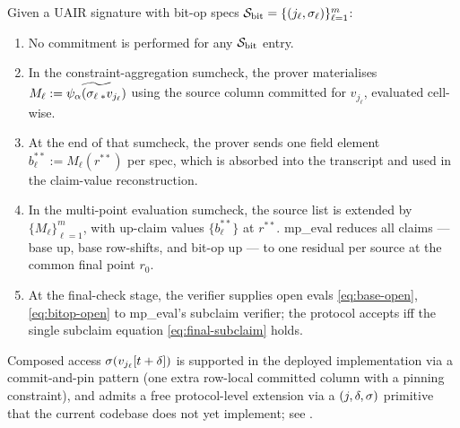 \begin{construction}
\label{cons:bitop}
Given a UAIR signature with bit-op specs
$\mathcal{S}_{\mathrm{bit}} = \{(j_\ell,\sigma_\ell)\}_{\ell=1}^{m}$:
\begin{enumerate}[leftmargin=2em]
  \item No commitment is performed for any $\mathcal{S}_{\mathrm{bit}}$ entry.
  \item In the constraint-aggregation sumcheck, the prover materialises
    $M_{\ell} := \widetilde{\psi_{\alpha}(\sigma_{\ell}\,_* v_{j_\ell})}$
    using the source column committed for $v_{j_\ell}$, evaluated
    cell-wise.
  \item At the end of that sumcheck, the prover sends one field element
    $b_{\ell}^{**} := M_{\ell}(r^{**})$ per spec, which is absorbed into
    the transcript and used in the claim-value reconstruction.
  \item In the multi-point evaluation sumcheck, the source list is
    extended by $\{M_{\ell}\}_{\ell=1}^{m}$, with up-claim values
    $\{b_{\ell}^{**}\}$ at $r^{**}$. mp\_eval reduces all claims —
    base up, base row-shifts, and bit-op up — to one residual per
    source at the common final point $r_0$.
  \item At the final-check stage, the verifier supplies open evals
    \cref{eq:base-open}, \cref{eq:bitop-open} to mp\_eval's subclaim
    verifier; the protocol accepts iff the single subclaim equation
    \cref{eq:final-subclaim} holds.
\end{enumerate}
Composed access $\sigma(v_{j_\ell}[t+\delta])$ is supported in the
deployed implementation via a commit-and-pin pattern (one extra
row-local committed column with a pinning constraint), and admits a
free protocol-level extension via a $(j,\delta,\sigma)$ primitive
that the current codebase does not yet implement; see
.
\end{construction}
